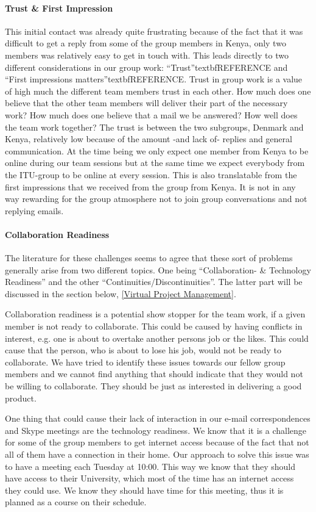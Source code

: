 \paragraph{Trust & First Impression}
This initial contact was already quite frustrating because of the fact that it was difficult to get a reply from some of the group members in Kenya, only two members was relatively easy to get in touch with. This leads directly to two different considerations in our group work: ``Trust''textbf{REFERENCE} and ``First impressions matters''textbf{REFERENCE}. Trust in group work is a value of high much the different team members trust in each other. How much does one believe that the other team members will deliver their part of the necessary work? How much does one believe that a mail we be answered? How well does the team work together? The trust is between the two subgroups, Denmark and Kenya, relatively low because of the amount -and lack of- replies and general communication. At the time being we only expect one member from Kenya to be online during our team sessions but at the same time we expect everybody from the ITU-group to be online at every session. This is also translatable from the first impressions that we received from the group from Kenya. It is not in any way rewarding for the group atmosphere not to join group conversations and not replying emails. 

\paragraph{Collaboration Readiness}
The literature for these challenges seems to agree that these sort of problems generally arise from two different topics. One being ``Collaboration- & Technology Readiness'' and the other ``Continuities/Discontinuities''. The latter part will be discussed in the section below, \ref{Virtual Project Management}.

Collaboration readiness is a potential show stopper for the team work, if a given member is not ready to collaborate. This could be caused by having conflicts in interest, e.g. one is about to overtake another persons job or the likes. This could cause that the person, who is about to lose his job, would not be ready to collaborate. We have tried to identify these issues towards our fellow group members and we cannot find anything that should indicate that they would not be willing to collaborate. They should be just as interested in delivering a good product. 

One thing that could cause their lack of interaction in our e-mail correspondences and Skype meetings are the technology readiness. We know that it is a challenge for some of the group members to get internet access because of the fact that not all of them have a connection in their home. Our approach to solve this issue was to have a meeting each Tuesday at 10:00. This way we know that they should have access to their University, which most of the time has an internet access they could use. We know they should have time for this meeting, thus it is planned as a course on their schedule.

